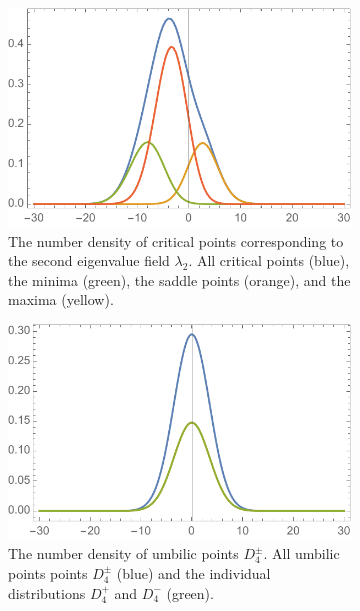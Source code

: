 \documentclass[a4paper, 11pt]{article}
\begin{document}
\begin{figure}
\centering
\begin{subfigure}[b]{0.32\textwidth}
\includegraphics[width=\textwidth]{Lambda2Density}
\caption{The number density of critical points corresponding to the second eigenvalue field $\lambda_2$. All critical points (blue), the minima (green), the saddle points (orange), and the maxima (yellow).}
\end{subfigure}
\begin{subfigure}[b]{0.32\textwidth}
\includegraphics[width=\textwidth]{D4Density}
\caption{The number density of umbilic points $D_4^{\pm}$. All umbilic points points $D_4^{\pm}$ (blue) and the individual distributions $D_4^+$ and $D_4^-$ (green).\\$ $\\}
\end{subfigure}
\begin{subfigure}[b]{0.32\textwidth}

\end{subfigure}
\end{figure}
\end{document}
